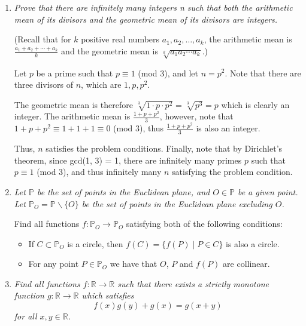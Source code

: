 \documentclass{article}
\begin{document}
\begin{enumerate}[1.]
{What is the least integer $k$ for which it is always possible to finish the game in at most $k$ turns?}


\vspace{6pt}
\item %
{\itshape Prove that there are infinitely many integers n such that both the arithmetic mean of its divisors and the geometric mean of its divisors are integers.

(Recall that for $k$ positive real numbers $a_1, a_2, \dotsc, a_k$, the arithmetic mean is $\frac{a_1 +a_2 +\dotsb +a_k}{k}$ and the geometric mean is $\sqrt[k]{a_1 a_2 \dotsm a_k}$.)
}

Let $p$ be a prime such that $p \equiv 1$ (mod 3), and let $n = p^2$.  Note that there are three divisors of $n$, which are $1, p, p^2$.

The geometric mean is therefore $\sqrt[3]{1 \cdot p \cdot p^2} = \sqrt[3]{p^3} = p$ which is clearly an integer.  The arithmetic mean is $\frac{1 + p + p^2}{3}$, however, note that $1 + p + p^2 \equiv 1 + 1 + 1 \equiv 0$ (mod 3), thus $\frac{1 + p + p^2}{3}$ is also an integer.

Thus, $n$ satisfies the problem conditions.  Finally, note that by Dirichlet's theorem, since gcd(1, 3) = 1, there are infinitely many primes $p$ such that $p \equiv 1$ (mod 3), and thus infinitely many $n$ satisfying the problem condition. 


\vspace{6pt}
\item %
{\itshape Let $\mathbb{P}$ be the set of points in the Euclidean plane, and $O \in \mathbb{P}$ be a given point. Let $\mathbb{P}_O = \mathbb{P} \backslash \{O\}$ be the set of points in the Euclidean plane excluding $O$.

Find all functions $f : \mathbb{P}_O \to \mathbb{P}_O$ satisfying both of the following conditions:
\begin{itemize}
  \item If $C \subset \mathbb{P}_O$ is a circle, then $f(C) = \{ f(P) \mid P \in C \}$ is also a circle.
  \item For any point $P \in \mathbb{P}_O$ we have that $O$, $P$ and $f(P)$ are collinear.
\end{itemize}}


\vspace{6pt}
\item %
{\itshape Find all functions $f : \mathbb{R} \to \mathbb{R}$ such that there exists a strictly monotone function $g : \mathbb{R} \to \mathbb{R}$ which satisfies
\[ f(x)g(y) + g(x) = g(x+y) \]
for all $x, y \in \mathbb{R}$.}


\end{enumerate}
\end{document}
